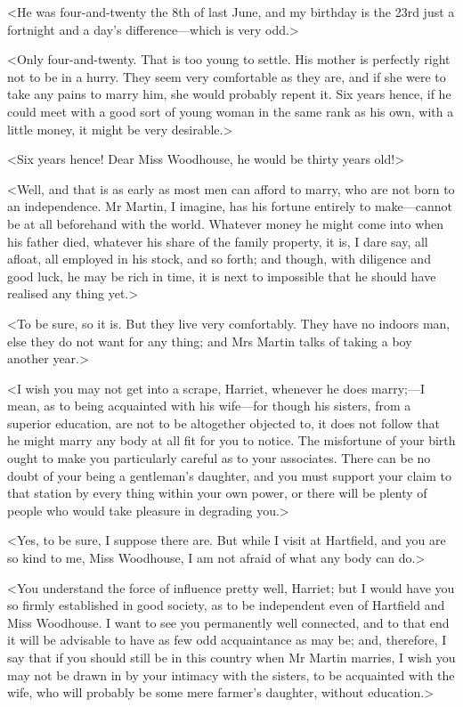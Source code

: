<He was four-and-twenty the 8th of last June, and my birthday is the 23rd just a fortnight and a day's difference—which is very odd.>

<Only four-and-twenty. That is too young to settle. His mother is perfectly right not to be in a hurry. They seem very comfortable as they are, and if she were to take any pains to marry him, she would probably repent it. Six years hence, if he could meet with a good sort of young woman in the same rank as his own, with a little money, it might be very desirable.>

<Six years hence! Dear Miss Woodhouse, he would be thirty years old!>

<Well, and that is as early as most men can afford to marry, who are not born to an independence. Mr Martin, I imagine, has his fortune entirely to make—cannot be at all beforehand with the world. Whatever money he might come into when his father died, whatever his share of the family property, it is, I dare say, all afloat, all employed in his stock, and so forth; and though, with diligence and good luck, he may be rich in time, it is next to impossible that he should have realised any thing yet.>

<To be sure, so it is. But they live very comfortably. They have no indoors man, else they do not want for any thing; and Mrs Martin talks of taking a boy another year.>

<I wish you may not get into a scrape, Harriet, whenever he does marry;—I mean, as to being acquainted with his wife—for though his sisters, from a superior education, are not to be altogether objected to, it does not follow that he might marry any body at all fit for you to notice. The misfortune of your birth ought to make you particularly careful as to your associates. There can be no doubt of your being a gentleman's daughter, and you must support your claim to that station by every thing within your own power, or there will be plenty of people who would take pleasure in degrading you.>

<Yes, to be sure, I suppose there are. But while I visit at Hartfield, and you are so kind to me, Miss Woodhouse, I am not afraid of what any body can do.>

<You understand the force of influence pretty well, Harriet; but I would have you so firmly established in good society, as to be independent even of Hartfield and Miss Woodhouse. I want to see you permanently well connected, and to that end it will be advisable to have as few odd acquaintance as may be; and, therefore, I say that if you should still be in this country when Mr Martin marries, I wish you may not be drawn in by your intimacy with the sisters, to be acquainted with the wife, who will probably be some mere farmer's daughter, without education.>

